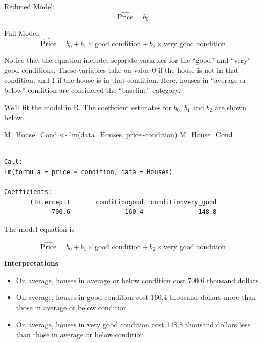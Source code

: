 \documentclass[
  letterpaper,
  DIV=11,
  numbers=noendperiod]{scrreprt}
\newenvironment{Shaded}{\begin{snugshade}}{\end{snugshade}}
\newcommand{\AttributeTok}[1]{\textcolor[rgb]{0.40,0.45,0.13}{#1}}
\newcommand{\FunctionTok}[1]{\textcolor[rgb]{0.28,0.35,0.67}{#1}}
\newcommand{\NormalTok}[1]{\textcolor[rgb]{0.00,0.23,0.31}{#1}}
\newcommand{\OtherTok}[1]{\textcolor[rgb]{0.00,0.23,0.31}{#1}}
\newcommand{\SpecialCharTok}[1]{\textcolor[rgb]{0.37,0.37,0.37}{#1}}
\providecommand{\tightlist}{%
  \setlength{\itemsep}{0pt}\setlength{\parskip}{0pt}}\usepackage{longtable,booktabs,array}
\begin{document}
Reduced Model: \[\widehat{\text{Price}}= b_0\]

Full Model:
\[\widehat{\text{Price}}= b_0+ b_1 \times\text{good condition}+ b_2\times\text{very good condition}\]

Notice that the equation includes separate variables for the ``good''
and ``very'' good conditions. These variables take on value 0 if the
house is not in that condition, and 1 if the house is in that condition.
Here, houses in ``average or below'' condition are considered the
``baseline'' category.

We'll fit the model in R. The coefficient estimates for \(b_0\), \(b_1\)
and \(b_2\) are shown below.

\begin{Shaded}
\begin{Highlighting}[]
\NormalTok{M\_House\_Cond }\OtherTok{\textless{}{-}} \FunctionTok{lm}\NormalTok{(}\AttributeTok{data=}\NormalTok{Houses, price}\SpecialCharTok{\textasciitilde{}}\NormalTok{condition)}
\NormalTok{M\_House\_Cond}
\end{Highlighting}
\end{Shaded}

\begin{verbatim}

Call:
lm(formula = price ~ condition, data = Houses)

Coefficients:
       (Intercept)       conditiongood  conditionvery_good  
             700.6               160.4              -148.8  
\end{verbatim}

The model equation is

\[
\widehat{\text{Price}}= b_0+ b_1 \times\text{good condition}+ b_2\times\text{very good condition}
\]

\textbf{Interpretations}

\begin{itemize}
\tightlist
\item
  On average, houses in average or below condition cost 700.6 thousand
  dollars.\\
\item
  On average, houses in good condition cost 160.4 thousand dollars more
  than those in average or below condition.\\
\item
  On average, houses in very good condition cost 148.8 thousand dollars
  less than those in average or below condition.
\end{itemize}
\end{document}
